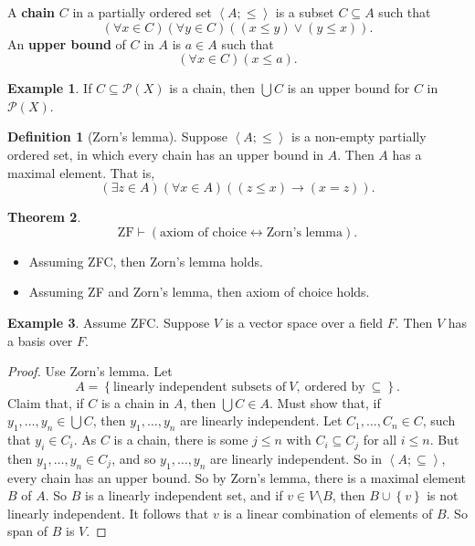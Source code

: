 \documentclass{article}
\newcommand{\rb}[1]{\left( #1 \right)}
\newcommand{\cb}[1]{\left\{ #1 \right\}}
\newcommand{\ab}[1]{\left\langle #1 \right\rangle}
\newcommand{\orb}[2]{\rb{#1 \lor #2}}
\newcommand{\impb}[2]{\rb{#1 \rightarrow #2}}
\newcommand{\iffb}[2]{\rb{#1 \leftrightarrow #2}}
\newcommand{\fab}[1]{\rb{\forall #1}}
\newcommand{\teb}[1]{\rb{\exists #1}}
\newcommand{\eqb}[2]{\rb{#1 = #2}}
\newcommand{\leb}[2]{\rb{#1 \le #2}}
\theoremstyle{definition}\newtheorem{definition}{Definition}[subsection]
\theoremstyle{definition}\newtheorem{remark1}[definition]{Remark}
\theoremstyle{definition}\newtheorem{example1}[definition]{Example}
\theoremstyle{definition}\newtheorem*{remark2}{Remark}
\theoremstyle{definition}\newtheorem*{example2}{Example}
\theoremstyle{definition}\newtheorem*{note}{Note}
\theoremstyle{definition}\newtheorem*{notation}{Notation}
\newtheorem{theorem}[definition]{Theorem}
\begin{document}
A \textbf{chain} $ C $ in a partially ordered set $ \ab{A; \le} $ is a subset $ C \subseteq A $ such that
$$ \fab{x \in C}\fab{y \in C}\orb{\leb{x}{y}}{\leb{y}{x}}. $$
An \textbf{upper bound} of $ C $ in $ A $ is $ a \in A $ such that
$$ \fab{x \in C}\leb{x}{a}. $$

\begin{example2}
If $ C \subseteq \mathcal{P}\rb{X} $ is a chain, then $ \bigcup C $ is an upper bound for $ C $ in $ \mathcal{P}\rb{X} $.
\end{example2}

\begin{definition}[Zorn's lemma]
Suppose $ \ab{A; \le} $ is a non-empty partially ordered set, in which every chain has an upper bound in $ A $. Then $ A $ has a maximal element. That is,
$$ \teb{z \in A}\fab{x \in A}\impb{\leb{z}{x}}{\eqb{x}{z}}. $$
\end{definition}

\begin{theorem}
\label{thm:4.3.2}
$$ \text{ZF} \vdash \iffb{\text{axiom of choice}}{\text{Zorn's lemma}}. $$
\begin{itemize}
\item Assuming ZFC, then Zorn's lemma holds.
\item Assuming ZF and Zorn's lemma, then axiom of choice holds.
\end{itemize}
\end{theorem}

\begin{example1}
Assume ZFC. Suppose $ V $ is a vector space over a field $ F $. Then $ V $ has a basis over $ F $.
\end{example1}

\begin{proof}
Use Zorn's lemma. Let
$$ A = \cb{\text{linearly independent subsets of} \ V, \ \text{ordered by} \ \subseteq}. $$
Claim that, if $ C $ is a chain in $ A $, then $ \bigcup C \in A $. Must show that, if $ y_1, \dots, y_n \in \bigcup C $, then $ y_1, \dots, y_n $ are linearly independent. Let $ C_1, \dots, C_n \in C $, such that $ y_i \in C_i $. As $ C $ is a chain, there is some $ j \le n $ with $ C_i \subseteq C_j $ for all $ i \le n $. But then $ y_1, \dots, y_n \in C_j $, and so $ y_1, \dots, y_n $ are linearly independent. So in $ \ab{A; \subseteq} $, every chain has an upper bound. So by Zorn's lemma, there is a maximal element $ B $ of $ A $. So $ B $ is a linearly independent set, and if $ v \in V \setminus B $, then $ B \cup \cb{v} $ is not linearly independent. It follows that $ v $ is a linear combination of elements of $ B $. So span of $ B $ is $ V $.
\end{proof}
\end{document}
